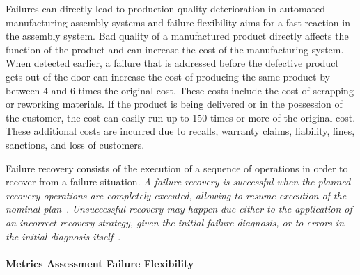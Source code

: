 Failures can directly lead to production quality deterioration in automated manufacturing assembly systems and failure flexibility aims for a fast reaction in the assembly system. Bad quality of a manufactured product directly affects the function of the product and can increase the cost of the manufacturing system. When detected earlier, a failure that is addressed before the defective product gets out of the door can increase the cost of producing the same product by between 4 and 6 times the original cost. These costs include the cost of scrapping or reworking materials. If the product is being delivered or in the possession of the customer, the cost can easily run up to 150 times or more of the original cost. These additional costs are incurred due to recalls, warranty claims, liability, fines, sanctions, and loss of customers.

Failure recovery consists of the execution of a sequence of operations in order to recover from a failure situation. \emph{A failure recovery is successful when the planned recovery operations are completely executed, allowing to resume execution of the nominal plan}~\cite{SeabraLopes.1999}.  \emph{Unsuccessful recovery may happen due either to the application of an incorrect recovery strategy, given the initial failure diagnosis, or to errors in the initial diagnosis itself}~\cite{SeabraLopes.1999}.







\paragraph{Metrics Assessment Failure Flexibility --}

